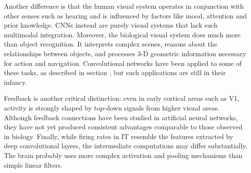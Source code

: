 Another difference is that the human visual system operates in conjunction with other senses such as hearing and is influenced by factors like mood, attention and prior knowledge. CNNs instead are purely visual systems that lack such multimodal integration. Moreover, the biological visual system does much more than object recognition. It interprets complex scenes, reasons about the relationships between objects, and processes 3-D geometric information necessary for action and navigation.  
Convolutional networks have been applied to some of these tasks, as described in section , but such applications are still in their infancy.  

Feedback is another critical distinction: even in early cortical areas such as V1, activity is strongly shaped by top-down signals from higher visual areas. Although feedback connections have been studied in artificial neural networks, they have not yet produced consistent advantages comparable to those observed in biology. Finally, while firing rates in IT resemble the features extracted by deep convolutional layers, the intermediate computations may differ substantially. The brain probably uses more complex activation and pooling mechanisms than simple linear filters.

\clearpage